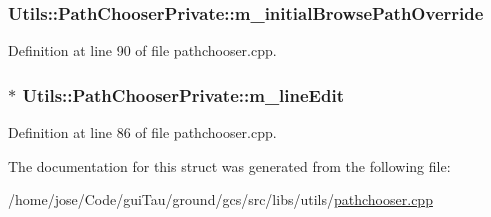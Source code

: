 \hypertarget{struct_utils_1_1_path_chooser_private_a4f55a8d0bc8cc0199a158f632e6f053a}{
\subsubsection[{m\-\_\-initial\-Browse\-Path\-Override}]{ Utils\-::\-Path\-Chooser\-Private\-::m\-\_\-initial\-Browse\-Path\-Override}}\label{struct_utils_1_1_path_chooser_private_a4f55a8d0bc8cc0199a158f632e6f053a}


Definition at line 90 of file pathchooser.\-cpp.

\hypertarget{struct_utils_1_1_path_chooser_private_ae5140b32894490e7013b4f9f8ee18afc}{
\subsubsection[{m\-\_\-line\-Edit}]{$\ast$ Utils\-::\-Path\-Chooser\-Private\-::m\-\_\-line\-Edit}}\label{struct_utils_1_1_path_chooser_private_ae5140b32894490e7013b4f9f8ee18afc}


Definition at line 86 of file pathchooser.\-cpp.



The documentation for this struct was generated from the following file\-:\begin{DoxyCompactItemize}
\item 
/home/jose/\-Code/gui\-Tau/ground/gcs/src/libs/utils/\hyperlink{pathchooser_8cpp}{pathchooser.\-cpp}\end{DoxyCompactItemize}
